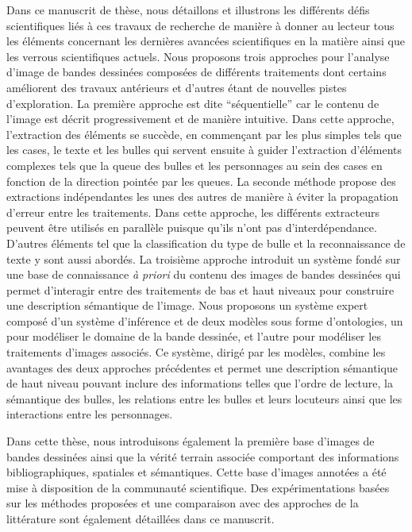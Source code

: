 Dans ce manuscrit de thèse, nous détaillons et illustrons les différents défis scientifiques liés à ces travaux de recherche de manière à donner au lecteur tous les éléments concernant les dernières avancées scientifiques en la matière ainsi que les verrous scientifiques actuels. 
Nous proposons trois approches pour l'analyse d'image de bandes dessinées composées de différents traitements dont certains améliorent des travaux antérieurs et d'autres étant de nouvelles pistes d'exploration.
La première approche est dite ``séquentielle'' car le contenu de l'image est décrit progressivement et de manière intuitive.
Dans cette approche, l'extraction des éléments se succède, en commençant par les plus simples tels que les cases, le texte et les bulles qui servent ensuite à guider l'extraction d'éléments complexes tels que la queue des bulles et les personnages au sein des cases en fonction de la direction pointée par les queues.
La seconde méthode propose des extractions indépendantes les unes des autres de manière à éviter la propagation d'erreur entre les traitements.
Dans cette approche, les différents extracteurs peuvent être utilisés en parallèle puisque qu'ils n'ont pas d'interdépendance.
D'autres éléments tel que la classification du type de bulle et la reconnaissance de texte y sont aussi abordés.
La troisième approche introduit un système fondé sur une base de connaissance \emph{à priori} du contenu des images de bandes dessinées qui permet d'interagir entre des traitements de bas et haut niveaux pour construire une description sémantique de l'image.
Nous proposons un système expert composé d'un système d'inférence et de deux modèles sous forme d'ontologies, un pour modéliser le domaine de la bande dessinée, et l'autre pour modéliser les traitements d'images associés.
Ce système, dirigé par les modèles, combine les avantages des deux approches précédentes et permet une description sémantique de haut niveau pouvant inclure des informations telles que l'ordre de lecture, la sémantique des bulles, les relations entre les bulles et leurs locuteurs ainsi que les interactions entre les personnages.

Dans cette thèse, nous introduisons également la première base d'images de bandes dessinées ainsi que la vérité terrain associée comportant des informations bibliographiques, spatiales et sémantiques.
Cette base d'images annotées a été mise à disposition de la communauté scientifique.
Des expérimentations basées sur les méthodes proposées et une comparaison avec des approches de la littérature sont également détaillées dans ce manuscrit.



\clearpage\thispagestyle{empty}
